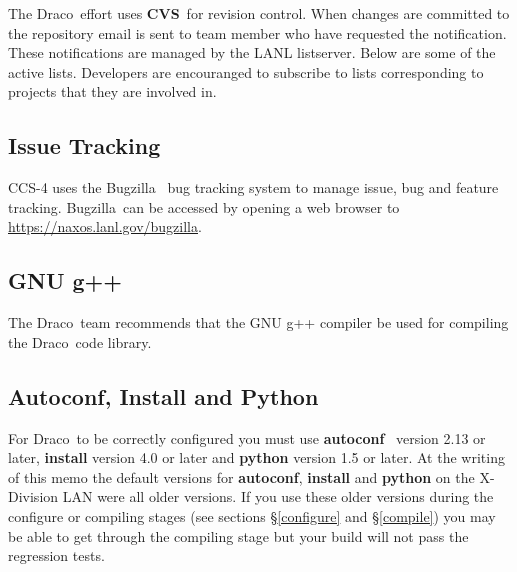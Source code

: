 \documentclass[10pt]{nmemo}
\newcommand{\comp}[1]{\normalfont\normalsize\texttt{#1}}
\newcommand{\draco}{{\normalfont\sffamily Draco}}
\newcommand{\cvs}{{\normalfont\bfseries CVS}}
\newcommand{\bugz}{{\normalfont\sffamily Bugzilla}}
\begin{document}
The \draco\ effort uses \cvs\ for revision control.  When changes are
committed to the repository email is sent to team member who have
requested the notification.  These notifications are managed by the
LANL listserver.  Below are some of the active lists.  Developers are
encouranged to subscribe to lists corresponding to projects that they
are involved in.

\subsection{Issue Tracking}

CCS-4 uses the \bugz~\cite{bugz} bug tracking system to manage issue,
bug and feature tracking.  \bugz\ can be accessed by opening a web
browser to \url{https://naxos.lanl.gov/bugzilla}.

\subsection{GNU g++}

The \draco\ team recommends that the GNU g++ compiler be used for
compiling the \draco\ code library. 

\subsection{Autoconf, Install and Python}

For \draco\ to be correctly configured you must use
\textbf{autoconf}~\cite{autoconf} version 2.13 or later, \textbf{install}
version 4.0 or later and \textbf{python} version 1.5 or later.  At the
writing of this memo the default versions for \textbf{autoconf},
\textbf{install} and \textbf{python} on the X-Division LAN were all older
versions.  If you use these older versions during the configure or
compiling stages (see sections \S\ref{configure} and \S\ref{compile})
you may be able to get through the compiling stage but your build will
not pass the regression tests.  


\end{document}
